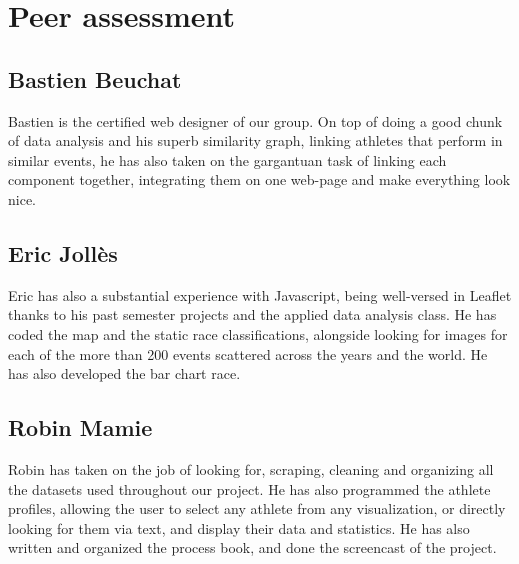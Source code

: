 \section{Peer assessment}

\subsection{Bastien Beuchat}

Bastien is the certified web designer of our group.
On top of doing a good chunk of data analysis and his superb similarity graph, linking athletes that perform in similar events, he has also taken on the gargantuan task of linking each component together, integrating them on one web-page and make everything look nice.


\subsection{Eric Jollès}

Eric has also a substantial experience with Javascript, being well-versed in Leaflet thanks to his past semester projects and the applied data analysis class.
He has coded the map and the static race classifications, alongside looking for images for each of the more than 200 events scattered across the years and the world.
He has also developed the bar chart race.

\subsection{Robin Mamie}

Robin has taken on the job of looking for, scraping, cleaning and organizing all the datasets used throughout our project.
He has also programmed the athlete profiles, allowing the user to select any athlete from any visualization, or directly looking for them via text, and display their data and statistics.
He has also written and organized the process book, and done the screencast of the project.
